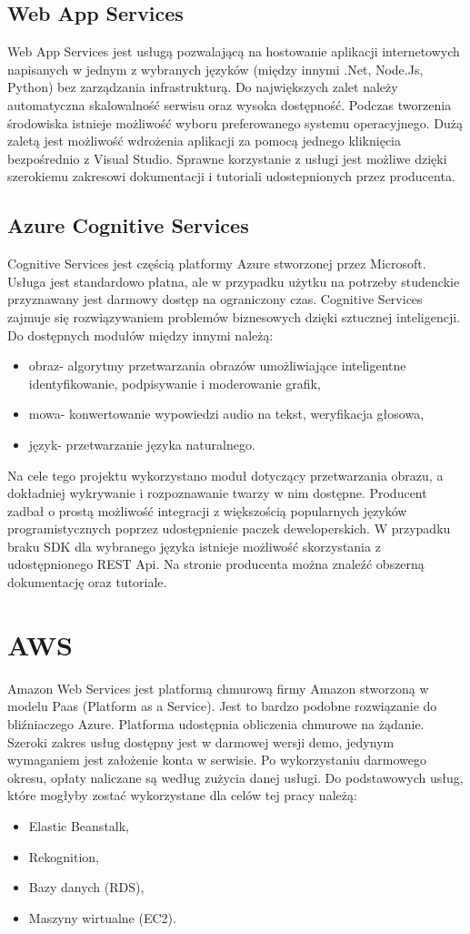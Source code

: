 \subsection{Web App Services}
Web App Services jest usługą pozwalającą na hostowanie aplikacji internetowych napisanych w jednym z wybranych języków (między innymi .Net, Node.Js, Python) bez zarządzania infrastrukturą. Do największych zalet należy automatyczna skalowalność serwisu oraz wysoka dostępność. Podczas tworzenia środowiska istnieje możliwość wyboru preferowanego systemu operacyjnego. Dużą zaletą jest możliwość wdrożenia aplikacji za pomocą jednego kliknięcia bezpośrednio z Visual Studio. Sprawne korzystanie z usługi jest możliwe dzięki szerokiemu zakresowi dokumentacji i tutoriali udostepnionych przez producenta.
\subsection{Azure Cognitive Services}
Cognitive Services jest częścią platformy Azure stworzonej przez Microsoft. Usługa jest standardowo płatna, ale w przypadku użytku na potrzeby studenckie przyznawany jest darmowy dostęp na ograniczony czas. Cognitive Services zajmuje się rozwiązywaniem problemów biznesowych dzięki sztucznej inteligencji. Do dostępnych modułów między innymi należą:
\begin{itemize}
\item obraz- algorytmy przetwarzania obrazów umożliwiające inteligentne identyfikowanie, podpisywanie i moderowanie grafik,
\item mowa- konwertowanie wypowiedzi audio na tekst, weryfikacja głosowa,
\item język- przetwarzanie języka naturalnego.
\end{itemize}
Na cele tego projektu wykorzystano moduł dotyczący przetwarzania obrazu, a dokładniej wykrywanie i rozpoznawanie twarzy w nim dostępne. Producent zadbał o prostą możliwość integracji z większością popularnych języków programistycznych poprzez udostępnienie paczek deweloperskich. W przypadku braku SDK dla wybranego języka istnieje możliwość skorzystania z udostępnionego REST Api. Na stronie producenta można znaleźć obszerną dokumentację oraz tutoriale.

\section{AWS} \label{aws}
Amazon Web Services jest platformą chmurową firmy Amazon stworzoną w modelu Paas (Platform as a Service). Jest to bardzo podobne rozwiązanie do bliźniaczego Azure. Platforma udostępnia obliczenia chmurowe na żądanie. Szeroki zakres usług dostępny jest w darmowej wersji demo, jedynym wymaganiem jest założenie konta w serwisie. Po wykorzystaniu darmowego okresu, opłaty naliczane są według zużycia danej usługi. Do podstawowych usług, które mogłyby zostać wykorzystane dla celów tej pracy należą:
\begin{itemize}
    \item Elastic Beanstalk,
    \item Rekognition,
    \item Bazy danych (RDS),
    \item Maszyny wirtualne (EC2).
\end{itemize}
